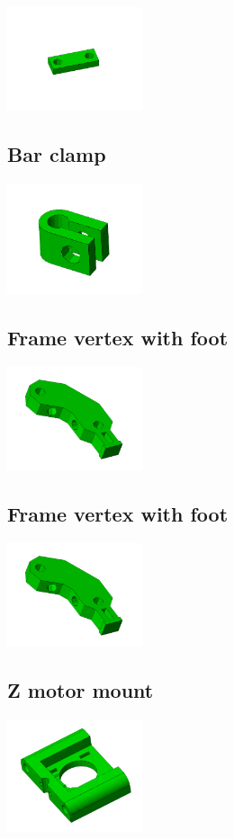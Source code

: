 \documentclass[11pt]{article}
\begin{document}
\includegraphics[width=4cm]{images/belt-clamp.jpg}
\subsection{Bar clamp}


\includegraphics[width=4cm]{images/bar-clamp.jpg}
\subsection{Frame vertex with foot}


\includegraphics[width=4cm]{images/frame-vertex-foot.jpg}
\subsection{Frame vertex with foot}


\includegraphics[width=4cm]{images/frame-vertex-foot.jpg}
\subsection{Z motor mount}


\includegraphics[width=4cm]{images/z-motor-mount.jpg}
\end{document}
